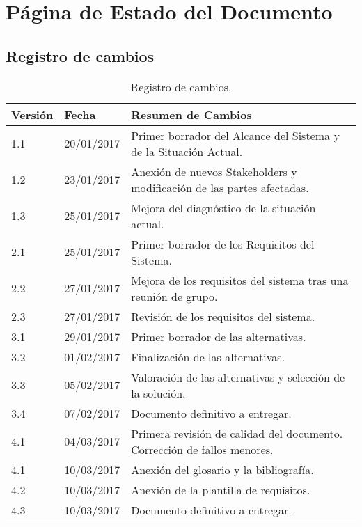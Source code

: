 \section{Página de Estado del Documento}

\subsection{Registro de cambios}
\begin{table}[htbp]
\begin{center}
\begin{tabular}{l l p{11cm} }
\textbf{Versión}&\textbf{Fecha}&\textbf{Resumen de Cambios}\\
\hline \hline
1.1 & 20/01/2017 & Primer borrador del Alcance del Sistema y de la Situación Actual.\\
\hline
1.2 & 23/01/2017 & Anexión de nuevos Stakeholders y modificación de las partes afectadas.\\
\hline
1.3 & 25/01/2017 & Mejora del diagnóstico de la situación actual.\\
\hline
2.1 & 25/01/2017 & Primer borrador de los Requisitos del Sistema.\\
\hline
2.2 & 27/01/2017 & Mejora de los requisitos del sistema tras una reunión de grupo.\\
\hline
2.3 & 27/01/2017 & Revisión de los requisitos del sistema.\\
\hline
3.1 & 29/01/2017 & Primer borrador de las alternativas.\\
\hline
3.2 & 01/02/2017 & Finalización de las alternativas.\\
\hline
3.3 & 05/02/2017 & Valoración de las alternativas y selección de la solución.\\
\hline
3.4 & 07/02/2017 & Documento definitivo a entregar.\\
\hline
4.1 & 04/03/2017 & Primera revisión de calidad del documento. Corrección de fallos menores.\\
\hline
4.1 & 10/03/2017 & Anexión del glosario y la bibliografía.\\
\hline
4.2 & 10/03/2017 & Anexión de la plantilla de requisitos.\\
\hline
4.3 & 10/03/2017 & Documento definitivo a entregar.\\
\hline
\end{tabular}
\caption{Registro de cambios.}
\label{tabla:changeReg}
\end{center}
\end{table}
